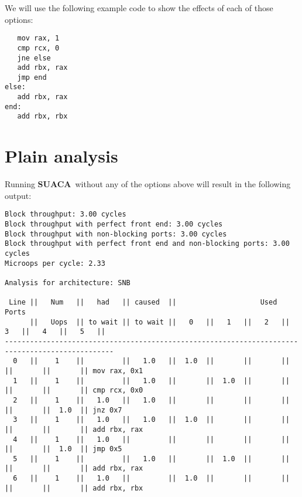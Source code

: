 \documentclass[a4paper,12pt,titlepage, twoside]{report}
\newcommand{\suaca}{\textbf{SUACA}}
\begin{document}
We will use the following example code to show the effects of each of those options:

\begin{center}
\begin{BVerbatim}
   mov rax, 1
   cmp rcx, 0
   jne else
   add rbx, rax
   jmp end
else:
   add rbx, rax
end:
   add rbx, rbx
\end{BVerbatim}    
\end{center}

\section{Plain analysis}
\label{sec:plain}
Running \suaca\ without any of the options above will result in the following output:


\begin{Verbatim}[fontsize=\scriptsize]
Block throughput: 3.00 cycles
Block throughput with perfect front end: 3.00 cycles
Block throughput with non-blocking ports: 3.00 cycles
Block throughput with perfect front end and non-blocking ports: 3.00 cycles
Microops per cycle: 2.33

Analysis for architecture: SNB

 Line ||   Num   ||   had   || caused  ||                    Used Ports
      ||   Uops  || to wait || to wait ||   0   ||   1   ||   2   ||   3   ||   4   ||   5   ||
------------------------------------------------------------------------------------------------
  0   ||    1    ||         ||   1.0   ||  1.0  ||       ||       ||       ||       ||       || mov rax, 0x1
  1   ||    1    ||         ||   1.0   ||       ||  1.0  ||       ||       ||       ||       || cmp rcx, 0x0
  2   ||    1    ||   1.0   ||   1.0   ||       ||       ||       ||       ||       ||  1.0  || jnz 0x7
  3   ||    1    ||   1.0   ||   1.0   ||  1.0  ||       ||       ||       ||       ||       || add rbx, rax
  4   ||    1    ||   1.0   ||         ||       ||       ||       ||       ||       ||  1.0  || jmp 0x5
  5   ||    1    ||         ||   1.0   ||       ||  1.0  ||       ||       ||       ||       || add rbx, rax
  6   ||    1    ||   1.0   ||         ||  1.0  ||       ||       ||       ||       ||       || add rbx, rbx
\end{Verbatim}
\end{document}
